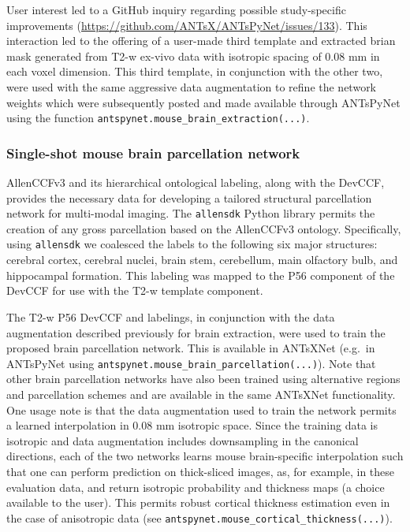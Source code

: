 \documentclass[
  12pt,
]{article}
\begin{document}
User interest led to a GitHub inquiry regarding possible study-specific
improvements (\url{https://github.com/ANTsX/ANTsPyNet/issues/133}). This
interaction led to the offering of a user-made third template and
extracted brian mask generated from T2-w ex-vivo data with isotropic
spacing of 0.08 mm in each voxel dimension. This third template, in
conjunction with the other two, were used with the same aggressive data
augmentation to refine the network weights which were subsequently
posted and made available through ANTsPyNet using the function
\texttt{antspynet.mouse\_brain\_extraction(...)}.

\subsubsection{Single-shot mouse brain parcellation
network}\label{single-shot-mouse-brain-parcellation-network}

AllenCCFv3 and its hierarchical ontological labeling, along with the
DevCCF, provides the necessary data for developing a tailored structural
parcellation network for multi-modal imaging. The \texttt{allensdk}
Python library permits the creation of any gross parcellation based on
the AllenCCFv3 ontology. Specifically, using \texttt{allensdk} we
coalesced the labels to the following six major structures: cerebral
cortex, cerebral nuclei, brain stem, cerebellum, main olfactory bulb,
and hippocampal formation. This labeling was mapped to the P56 component
of the DevCCF for use with the T2-w template component.

The T2-w P56 DevCCF and labelings, in conjunction with the data
augmentation described previously for brain extraction, were used to
train the proposed brain parcellation network. This is available in
ANTsXNet (e.g.~in ANTsPyNet using
\texttt{antspynet.mouse\_brain\_parcellation(...)}). Note that other
brain parcellation networks have also been trained using alternative
regions and parcellation schemes and are available in the same ANTsXNet
functionality. One usage note is that the data augmentation used to
train the network permits a learned interpolation in 0.08 mm isotropic
space. Since the training data is isotropic and data augmentation
includes downsampling in the canonical directions, each of the two
networks learns mouse brain-specific interpolation such that one can
perform prediction on thick-sliced images, as, for example, in these
evaluation data, and return isotropic probability and thickness maps (a
choice available to the user). This permits robust cortical thickness
estimation even in the case of anisotropic data (see
\texttt{antspynet.mouse\_cortical\_thickness(...)}).
\end{document}
